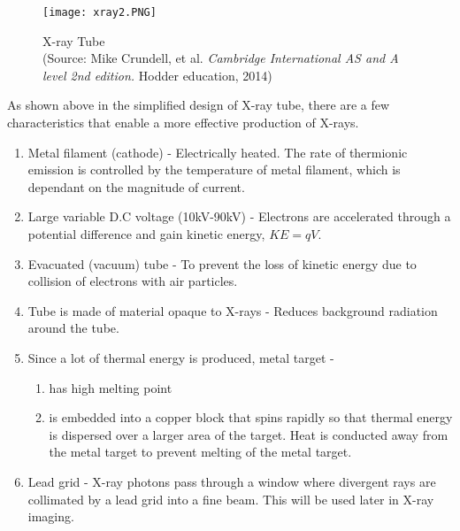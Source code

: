 \documentclass{article}
\begin{document}
\begin{figure}[H]
    \centering
    \captionsetup{justification=centering,margin=2cm}
    \texttt{[image: xray2.PNG]}
    \caption*{X-ray Tube \\ (Source: Mike Crundell, et al. \textit{Cambridge International AS and A level 2nd edition.} Hodder education, 2014)}
\end{figure}

As shown above in the simplified design of X-ray tube, there are a few characteristics that enable a more effective production of X-rays.
\begin{enumerate}
    \item Metal filament (cathode) - Electrically heated. The rate of thermionic emission is controlled by the temperature of metal filament, which is dependant on the magnitude of current.
    \item Large variable D.C voltage (10kV-90kV) - Electrons are accelerated through a potential difference and gain kinetic energy, $KE=qV$.
    \item Evacuated (vacuum) tube - To prevent the loss of kinetic energy due to collision of electrons with air particles.
    \item Tube is made of material opaque to X-rays - Reduces background radiation around the tube.
    \item Since a lot of thermal energy is produced, metal target - \begin{enumerate}
        \item has high melting point
        \item is embedded into a copper block that spins rapidly so that thermal energy is dispersed over a larger area of the target. Heat is conducted away from the metal target to prevent melting of the metal target.
    \end{enumerate}
    \item Lead grid - X-ray photons pass through a window where divergent rays are collimated by a lead grid into a fine beam. This will be used later in X-ray imaging.
\end{enumerate}
\end{document}
